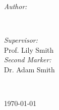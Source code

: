 \begin{titlepage}
  \begin{minipage}{0.4\textwidth}
  \begin{flushleft} \large
  \emph{Author:}\\
  \@author %
  \end{flushleft}
  \end{minipage}
  ~
  \begin{minipage}{0.4\textwidth}
  \begin{flushright} \large
  \emph{Supervisor:} \\
  Prof. Lily Smith \\[1.2em] %
  \emph{Second Marker:} \\
  Dr. Adam Smith %
  \end{flushright}
  \end{minipage}\\[2cm]
  \makeatother
  
  
  
  {\large \today}\\[2cm] %
  
  \vfill %
  
  \end{titlepage}